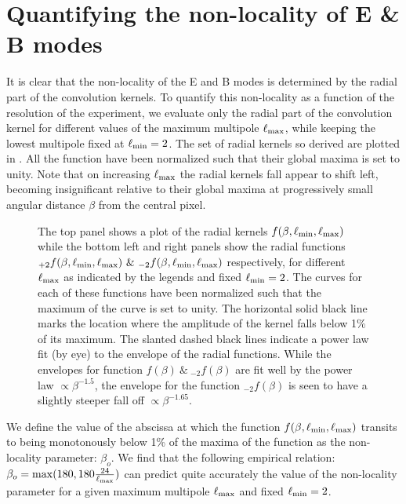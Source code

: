 \section{Quantifying the non-locality of E \& B modes} \label{sec:radial_locality}
It is clear that the non-locality of the E and B modes is determined by the radial part of the convolution kernels. To quantify this non-locality as a function of the resolution of the experiment, we evaluate only the radial part of the convolution kernel for different values of the maximum multipole $\ell_{\rm max}$, while keeping the lowest multipole fixed at $\ell_{\rm min}=2$. The set of radial kernels so derived are plotted in . All the function have been normalized such that their global maxima is set to unity. Note that on increasing $\ell_{\rm max}$ the radial kernels fall appear to shift left, becoming insignificant relative  to their global maxima at progressively small angular distance $\beta$ from the central pixel. 
%
\begin{figure}[!t]
\centering
{}
\caption{The top panel shows a plot of the radial kernels $f(\beta,\ell_{\rm min},\ell_{\rm max})$ while the bottom left and right panels show the radial functions ${}_{+2}f(\beta,\ell_{\rm min},\ell_{\rm max}) ~\&~ {}_{-2}f(\beta,\ell_{\rm min},\ell_{\rm max})$ respectively, for different $\ell_{\rm max}$ as indicated by the legends and fixed $\ell_{\rm min}=2$. The curves for each of these functions have been normalized such that the maximum of the curve is set to unity. The horizontal solid black line marks the location where the amplitude of the kernel falls below 1\% of its maximum. The slanted dashed black lines indicate a power law fit (by eye) to the envelope of the radial functions. While the envelopes for function $f(\beta)~\&~ {}_{-2}f(\beta)$ are fit well by the power law $\propto \beta^{-1.5}$, the envelope for the function ${}_{-2}f(\beta)$ is seen to have a slightly steeper fall off $\propto \beta^{-1.65}$.}
\label{fig:rad_ker_decay}
\end{figure}
%
We define the value of the abscissa at which the function $f(\beta,\ell_{\rm min},\ell_{\rm max})$ transits to being monotonously below 1\% of the maxima of the function as the non-locality parameter: $\beta_{o}$. We find that the following empirical relation: $\beta_o= {\rm max}(180,180 \frac{24}{\ell_{\rm max}})$ can predict quite accurately the value of the non-locality parameter for a given maximum multipole $\ell_{\rm max}$ and fixed $\ell_{\rm min}=2$. 

